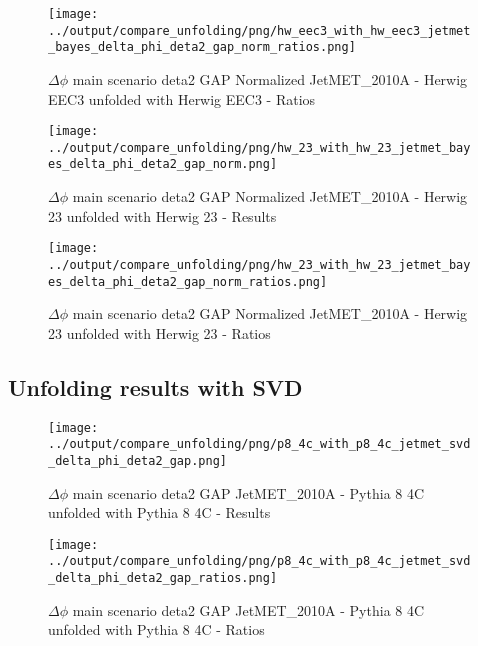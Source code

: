 \documentclass[11pt]{book}
\begin{document}
\begin{figure}[ht]
\centering
\texttt{[image: ../output/compare\_unfolding/png/hw\_eec3\_with\_hw\_eec3\_jetmet\_bayes\_delta\_phi\_deta2\_gap\_norm\_ratios.png]}
\caption{$\Delta\phi$ main scenario deta2 GAP Normalized JetMET\_2010A - Herwig EEC3 unfolded with Herwig EEC3 - Ratios}
\label{hw_eec3_hw_eec3_jetmet_bayes_delta_phi_deta2_gap_norm_b}
\end{figure}

\begin{figure}[ht]
\centering
\texttt{[image: ../output/compare\_unfolding/png/hw\_23\_with\_hw\_23\_jetmet\_bayes\_delta\_phi\_deta2\_gap\_norm.png]}
\caption{$\Delta\phi$ main scenario deta2 GAP Normalized JetMET\_2010A - Herwig 23 unfolded with Herwig 23 - Results}
\label{hw_23_hw_23_jetmet_bayes_delta_phi_deta2_gap_norm_a}
\end{figure}

\begin{figure}[ht]
\centering
\texttt{[image: ../output/compare\_unfolding/png/hw\_23\_with\_hw\_23\_jetmet\_bayes\_delta\_phi\_deta2\_gap\_norm\_ratios.png]}
\caption{$\Delta\phi$ main scenario deta2 GAP Normalized JetMET\_2010A - Herwig 23 unfolded with Herwig 23 - Ratios}
\label{hw_23_hw_23_jetmet_bayes_delta_phi_deta2_gap_norm_b}
\end{figure}



\clearpage
\subsection{Unfolding results with SVD}

\begin{figure}[ht]
\centering
\texttt{[image: ../output/compare\_unfolding/png/p8\_4c\_with\_p8\_4c\_jetmet\_svd\_delta\_phi\_deta2\_gap.png]}
\caption{$\Delta\phi$ main scenario deta2 GAP JetMET\_2010A - Pythia 8 4C unfolded with Pythia 8 4C - Results}
\label{p8_p8_jetmet_svd_delta_phi_deta2_gap_a}
\end{figure}

\begin{figure}[ht]
\centering
\texttt{[image: ../output/compare\_unfolding/png/p8\_4c\_with\_p8\_4c\_jetmet\_svd\_delta\_phi\_deta2\_gap\_ratios.png]}
\caption{$\Delta\phi$ main scenario deta2 GAP JetMET\_2010A - Pythia 8 4C unfolded with Pythia 8 4C - Ratios}
\label{p8_p8_jetmet_svd_delta_phi_deta2_gap_b}
\end{figure}
\end{document}
